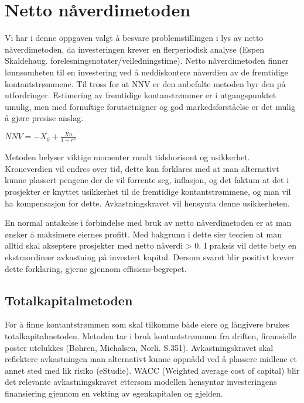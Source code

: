 \section{Netto nåverdimetoden}
Vi har i denne oppgaven valgt å besvare problemstillingen i lys av netto nåverdimetoden, da investeringen krever en flerperiodisk analyse (Espen Skaldehaug. forelesningsnotater/veiledningstime). Netto nåverdimetoden finner lønnsomheten til en investering ved å neddiskontere nåverdien av de fremtidige kontantstrømmene. Til tross for at NNV er den anbefalte metoden byr den på utfordringer. Estimering av fremtidige kontanstrømmer er i utgangspunktet umulig, men med fornuftige forutsetnigner og god markedsforståelse er det mulig å gjøre presise anslag. 

\indent \newline
\begin{math}
NNV={-X_0} + \frac {Xn}{1+r^n}
\end{math}

\indent \newline
Metoden belyser viktige momenter rundt tidshorisont og usikkerhet. Kroneverdien vil endres over tid, dette kan forklares med at man alternativt kunne plassert pengene der de vil forrente seg, inflasjon, og det faktum at det i prosjekter er knyttet usikkerhet til de fremtidige kontantstrømmene, og man vil ha kompensasjon for dette. Avkastningskravet vil hensynta denne usikkerheten. 

\indent \newline
En normal antakelse i forbindelse med bruk av netto nåverdimetoden er at man ønsker å maksimere eiernes profitt. Med bakgrunn i dette sier teorien at man alltid skal akseptere prosjekter med netto nåverdi > 0. I praksis vil dette bety en ekstraordinær avkastning på investert kapital. Dersom svaret blir positivt krever dette forklaring, gjerne gjennom effisiens-begrepet. 

\subsection*{Totalkapitalmetoden}
For å finne kontantstrømmen som skal tilkomme både eiere og långivere brukes totalkapitalmetoden. Metoden tar i bruk kontantstrømmen fra driften, finansielle poster utelukkes (Bøhren, Michalsen, Norli. S.351). Avkastningskravet skal reflektere avkastningen man alternativt kunne oppnådd ved å plassere midlene et annet sted med lik risiko (eStudie). WACC (Weighted average cost of capital) blir det relevante avkastningskravet ettersom modellen hensyntar investeringens finansiering gjennom en vekting av egenkapitalen og gjelden.

